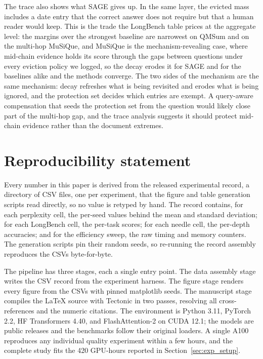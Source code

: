 The trace also shows what SAGE gives up. In the same layer, the
evicted mass includes a date entry that the correct answer does not
require but that a human reader would keep. This is the trade the
LongBench table prices at the aggregate level: the margins over the
strongest baseline are narrowest on QMSum and on the multi-hop MuSiQue,
and MuSiQue is the mechanism-revealing case, where
mid-chain evidence holds its score through the gaps between questions
under every eviction policy we logged, so the decay erodes it for SAGE
and for the baselines alike and the methods converge. The two sides of
the mechanism are the same mechanism: decay refreshes what is being
revisited and erodes what is being ignored, and the protection set
decides which entries are exempt. A query-aware compensation that
seeds the protection set from the question would likely close part of
the multi-hop gap, and the trace analysis suggests it should protect
mid-chain evidence rather than the document extremes.

\needspace{0.3\textheight}
\section{Reproducibility statement}\label{app:repro}

Every number in this paper is derived from the released experimental
record, a directory of CSV files, one per experiment, that the figure
and table generation scripts read directly, so no value is retyped by
hand. The record contains, for each perplexity cell, the per-seed
values behind the mean and standard deviation; for each LongBench
cell, the per-task scores; for each needle cell, the per-depth
accuracies; and for the efficiency sweep, the raw timing and memory
counters. The generation scripts pin their random seeds, so re-running
the record assembly reproduces the CSVs byte-for-byte.

The pipeline has three stages, each a single entry point. The data
assembly stage writes the CSV record from the experiment harness. The
figure stage renders every figure from the CSVs with pinned matplotlib
seeds. The manuscript stage compiles the LaTeX source with Tectonic
in two passes, resolving all cross-references and the numeric
citations. The environment is Python 3.11, PyTorch 2.2, HF
Transformers 4.40, and FlashAttention-2 on CUDA 12.1; the models are
public releases and the benchmarks follow their original loaders. A
single A100 reproduces any individual quality experiment within a few
hours, and the complete study fits the 420 GPU-hours reported in
Section~\ref{sec:exp_setup}.

